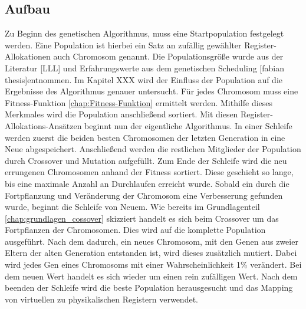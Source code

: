 \subsection{Aufbau}
\label{chap:aufbau}
Zu Beginn des genetischen Algorithmus, muss eine Startpopulation festgelegt werden. Eine Population ist hierbei ein Satz an zufällig gewählter Register-Allokationen auch Chromosom genannt. Die Populationsgröße wurde aus der Literatur [LLL] und Erfahrungswerte aus dem genetischen Scheduling [fabian thesis]entnommen. Im Kapitel XXX wird der Einfluss der Population auf die Ergebnisse  des Algorithmus genauer untersucht.
Für jedes Chromosom muss eine Fitness-Funktion \ref{chap:Fitness-Funktion} ermittelt werden. Mithilfe dieses Merkmales wird die Population anschließend sortiert. 
Mit diesen Register-Allokations-Ansätzen beginnt nun der eigentliche Algorithmus. In einer Schleife werden zuerst die beiden besten Chromosomen der letzten Generation in eine Neue abgespeichert. Anschließend werden die restlichen Mitglieder der Population durch Crossover und Mutation aufgefüllt. Zum Ende der Schleife wird die neu errungenen Chromosomen anhand der Fitness sortiert. Diese geschieht so lange, bis eine maximale Anzahl an Durchlaufen erreicht wurde. Sobald ein durch die Fortpflanzung und Veränderung der Chromosom eine Verbesserung gefunden wurde, beginnt die Schleife von Neuem.
Wie bereits im Grundlagenteil \ref{chap:grundlagen_cossover} skizziert handelt es sich beim Crossover um das Fortpflanzen der Chromosomen. Dies wird auf die komplette Population ausgeführt. Nach dem dadurch, ein neues Chromosom, mit den Genen aus zweier Eltern der alten Generation entstanden ist, wird dieses zusätzlich mutiert. Dabei wird jedes Gen eines Chromosoms mit einer Wahrscheinlichkeit 1\% verändert. Bei dem neuen Wert handelt es sich wieder um einen rein zufälligen Wert.
Nach dem beenden der Schleife wird die beste Population herausgesucht und das Mapping von virtuellen zu physikalischen Registern verwendet.

